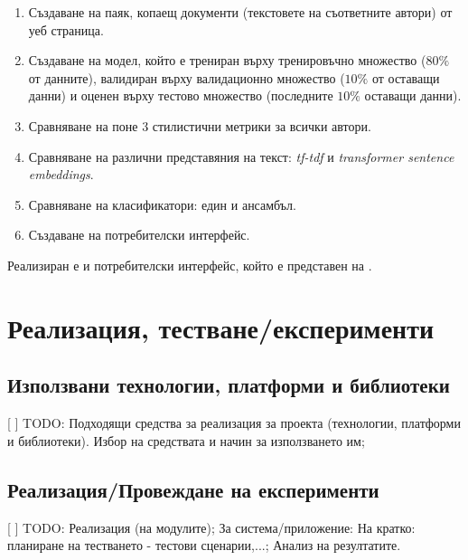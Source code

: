 \documentclass[12pt]{article}
\begin{document}
\begin{enumerate}
    \item Създаване на паяк, копаещ документи (текстовете на съответните автори) от уеб страница.
    \item Създаване на модел, който е трениран върху тренировъчно множество ($80\%$ от данните), валидиран върху валидационно множество ($10\%$ от оставащи данни) и оценен върху тестово множество (последните $10\%$ оставащи данни).
    \item Сравняване на поне 3 стилистични метрики за всички автори.
    \item Сравняване на различни представяния на текст: \textit{tf-tdf} и \textit{transformer sentence embeddings}.
    \item Сравняване на класификатори: един и ансамбъл.
    \item Създаване на потребителски интерфейс.
\end{enumerate}

\vspace{1em}

Реализиран е и потребителски интерфейс, който е представен на .

    

\section{Реализация, тестване/експерименти}

\subsection{Използвани технологии, платформи и библиотеки}

[ ] TODO: Подходящи средства за реализация за проекта (технологии, платформи и библиотеки). Избор на средствата и начин за използването им;


\subsection{Реализация/Провеждане на експерименти}

[ ] TODO: Реализация (на модулите); 
За система/приложение: На кратко: планиране на тестването - тестови сценарии,...; Анализ на резултатите.
\end{document}
